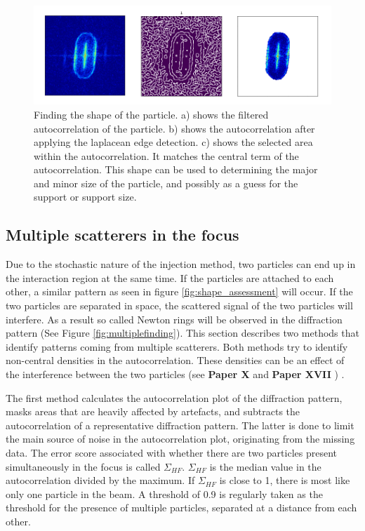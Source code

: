 \begin{figure}[!h]
\centering
\includegraphics[width=120mm]{Chapter_08_ImageClassification_Refined_Shape_Assessment2.png}
\caption{Finding the shape of the particle. a) shows the filtered autocorrelation of the particle. b) shows the autocorrelation after applying the laplacean edge detection. c) shows the selected area within the autocorrelation. It matches the central term of the autocorrelation. This shape can be used to determining the major and minor size of the particle, and possibly as a guess for the support or support size. }\label{fig:detailed_shape_assessment}
\end{figure}


\subsection{Multiple scatterers in the focus}

Due to the stochastic nature of the injection method, two particles can end up in the interaction region at the same time. If the particles are attached to each other, a similar pattern as seen in figure \ref{fig:shape_assessment} will occur. If the two particles are separated in space, the scattered signal of the two particles will interfere. As a result so called Newton rings will be observed in the diffraction pattern (See Figure \ref{fig:multiplefinding}). This section describes two methods that identify patterns coming from multiple scatterers. Both methods try to identify non-central densities in the autocorrelation. These densities can be an effect of the interference between the two particles (see \textbf{Paper X} and \textbf{Paper XVII} ) .

The first method calculates the autocorrelation plot of the diffraction pattern, masks areas that are heavily affected by artefacts, and subtracts the autocorrelation of a representative diffraction pattern. The latter is done to limit the main source of noise in the autocorrelation plot, originating from the missing data. The error score associated with whether there are two particles present simultaneously in the focus is called $\Sigma_{HF}$. $\Sigma_{HF}$ is the median value in the autocorrelation divided by the maximum. If $\Sigma_{HF}$ is close to 1, there is most like only one particle in the beam. A threshold of 0.9 is regularly taken as the threshold for the presence of multiple particles, separated at a distance from each other.


